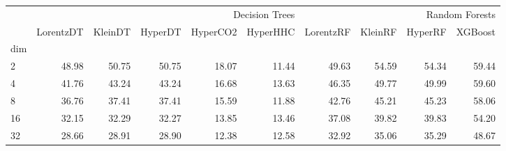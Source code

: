 \begin{tabular}{lrrrrrrrrr}
 & \multicolumn{5}{r}{Decision Trees} & \multicolumn{4}{r}{Random Forests} \\
 & LorentzDT & KleinDT & HyperDT & HyperCO2 & HyperHHC & LorentzRF & KleinRF & HyperRF & XGBoost \\
dim &  &  &  &  &  &  &  &  &  \\
2 & {\cellcolor[HTML]{2F984F}} \color[HTML]{F1F1F1} 48.98 & {\cellcolor[HTML]{238B45}} \color[HTML]{F1F1F1} 50.75 & {\cellcolor[HTML]{238B45}} \color[HTML]{F1F1F1} 50.75 & {\cellcolor[HTML]{F7FCF5}} \color[HTML]{000000} 18.07 & {\cellcolor[HTML]{F7FCF5}} \color[HTML]{000000} 11.44 & {\cellcolor[HTML]{2B934B}} \color[HTML]{F1F1F1} 49.63 & {\cellcolor[HTML]{05712F}} \color[HTML]{F1F1F1} 54.59 & {\cellcolor[HTML]{067230}} \color[HTML]{F1F1F1} 54.34 & {\cellcolor[HTML]{00441B}} \color[HTML]{F1F1F1} 59.44 \\
4 & {\cellcolor[HTML]{7AC77B}} \color[HTML]{000000} 41.76 & {\cellcolor[HTML]{6ABF71}} \color[HTML]{000000} 43.24 & {\cellcolor[HTML]{6ABF71}} \color[HTML]{000000} 43.24 & {\cellcolor[HTML]{F7FCF5}} \color[HTML]{000000} 16.68 & {\cellcolor[HTML]{F7FCF5}} \color[HTML]{000000} 13.63 & {\cellcolor[HTML]{45AD5F}} \color[HTML]{F1F1F1} 46.35 & {\cellcolor[HTML]{2B934B}} \color[HTML]{F1F1F1} 49.77 & {\cellcolor[HTML]{2A924A}} \color[HTML]{F1F1F1} 49.99 & {\cellcolor[HTML]{00441B}} \color[HTML]{F1F1F1} 59.60 \\
8 & {\cellcolor[HTML]{A7DBA0}} \color[HTML]{000000} 36.76 & {\cellcolor[HTML]{A0D99B}} \color[HTML]{000000} 37.41 & {\cellcolor[HTML]{A0D99B}} \color[HTML]{000000} 37.41 & {\cellcolor[HTML]{F7FCF5}} \color[HTML]{000000} 15.59 & {\cellcolor[HTML]{F7FCF5}} \color[HTML]{000000} 11.88 & {\cellcolor[HTML]{65BD6F}} \color[HTML]{F1F1F1} 42.76 & {\cellcolor[HTML]{46AE60}} \color[HTML]{F1F1F1} 45.21 & {\cellcolor[HTML]{46AE60}} \color[HTML]{F1F1F1} 45.23 & {\cellcolor[HTML]{00441B}} \color[HTML]{F1F1F1} 58.06 \\
16 & {\cellcolor[HTML]{C9EAC2}} \color[HTML]{000000} 32.15 & {\cellcolor[HTML]{C8E9C1}} \color[HTML]{000000} 32.29 & {\cellcolor[HTML]{C8E9C1}} \color[HTML]{000000} 32.27 & {\cellcolor[HTML]{F7FCF5}} \color[HTML]{000000} 13.85 & {\cellcolor[HTML]{F7FCF5}} \color[HTML]{000000} 13.46 & {\cellcolor[HTML]{94D390}} \color[HTML]{000000} 37.08 & {\cellcolor[HTML]{72C375}} \color[HTML]{000000} 39.82 & {\cellcolor[HTML]{70C274}} \color[HTML]{000000} 39.83 & {\cellcolor[HTML]{00441B}} \color[HTML]{F1F1F1} 54.20 \\
32 & {\cellcolor[HTML]{DEF2D9}} \color[HTML]{000000} 28.66 & {\cellcolor[HTML]{DBF1D6}} \color[HTML]{000000} 28.91 & {\cellcolor[HTML]{DBF1D6}} \color[HTML]{000000} 28.90 & {\cellcolor[HTML]{F7FCF5}} \color[HTML]{000000} 12.38 & {\cellcolor[HTML]{F7FCF5}} \color[HTML]{000000} 12.58 & {\cellcolor[HTML]{AEDEA7}} \color[HTML]{000000} 32.92 & {\cellcolor[HTML]{90D18D}} \color[HTML]{000000} 35.06 & {\cellcolor[HTML]{8BCF89}} \color[HTML]{000000} 35.29 & {\cellcolor[HTML]{00441B}} \color[HTML]{F1F1F1} 48.67 \\

\end{tabular}
